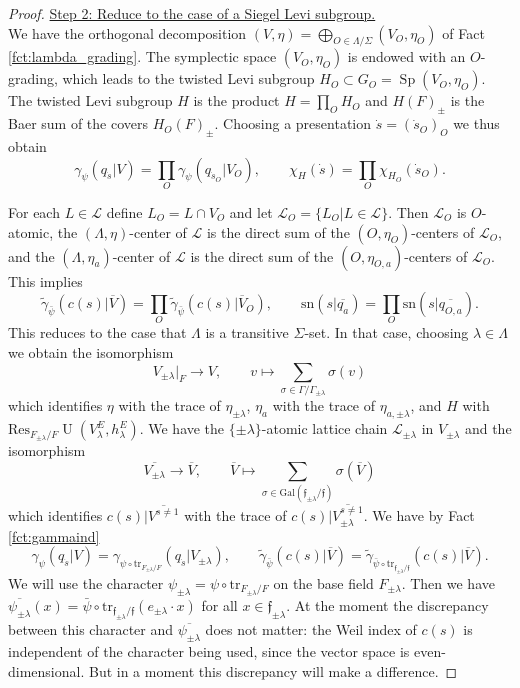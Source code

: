 \documentclass{article}
\def\mc#1{\mathcal{#1}}
\def\tx#1{\textrm{#1}}
\def\ol#1{\overline{#1}}
\def\ul#1{\underline{#1}}
\DeclareMathOperator{\Sp}{Sp}
\theoremstyle{definition}
\numberwithin{equation}{subsection}
\renewcommand{\-}{\hyp{}}
\DeclareMathOperator{\U}{U}
\newcommand{\rf}{\mathfrak{f}}
\begin{document}
\begin{proof}
	\ul{Step 2: Reduce to the case of a Siegel Levi subgroup.}\\
	We have the orthogonal decomposition $(V,\eta)=\bigoplus_{O \in \Lambda/\Sigma} (V_O,\eta_O)$ of Fact \ref{fct:lambda_grading}. The symplectic space $(V_O,\eta_O)$ is endowed with an $O$-grading, which leads to the twisted Levi subgroup $H_O \subset G_O=\Sp(V_O,\eta_O)$. The twisted Levi subgroup $H$ is the product $H=\prod_O H_O$ and $H(F)_\pm$ is the Baer sum of the covers $H_O(F)_\pm$. Choosing a presentation $\dot s = (\dot s_O)_O$ we thus obtain
	\[ \gamma_\psi(q_{\dot s}|V) = \prod_O \gamma_\psi(q_{\dot s_O}|V_O),\qquad \chi_H(\dot s) = \prod_O \chi_{H_O}(\dot s_O). \]
	
	For each $L \in \mc{L}$ define $L_O = L \cap V_O$ and let $\mc{L}_O=\{L_O|L \in \mc{L}\}$. Then $\mc{L}_O$ is $O$-atomic, the $(\Lambda,\eta)$-center of $\mc{L}$ is the direct sum of the $(O,\eta_O)$-centers of $\mc{L}_O$, and the $(\Lambda,\eta_a)$-center of $\mc{L}$ is the direct sum of the $(O,\eta_{O,a})$-centers of $\mc{L}_O$. This implies 
	\[ \tilde\gamma_{\bar\psi}(c(s)|\ol{V}) = \prod_O \tilde\gamma_{\bar\psi}(c(s)|\ol{V}_O),\qquad \tx{sn}(s|\ol{q_a}) = \prod_O \tx{sn}(s|\ol{q_{O,a}}). \]
	This reduces to the case that $\Lambda$ is a transitive $\Sigma$-set. In that case, choosing $\lambda \in \Lambda$ we obtain the isomorphism
	\[ V_{\pm\lambda}|_F \to V,\qquad v \mapsto \sum_{\sigma \in \Gamma/\Gamma_{\pm\lambda}}\sigma(v) \]
	which identifies $\eta$ with the trace of $\eta_{\pm\lambda}$, $\eta_a$ with the trace of $\eta_{a,\pm\lambda}$, and $H$ with $\tx{Res}_{F_{\pm\lambda}/F}\U(V_{\lambda}^E,h_\lambda^E)$. We have the $\{\pm\lambda\}$-atomic lattice chain $\mc{L}_{\pm\lambda}$ in $V_{\pm\lambda}$ and the isomorphism
	\[ \ol{V_{\pm\lambda}} \to \ol{V},\qquad \ol{V} \mapsto \sum_{\sigma \in \tx{Gal}(\rf_{\pm\lambda}/\rf)} \sigma(\ol{V}) \]
	which identifies $c(s)|\ol{V^{s\neq 1}}$ with the trace of $c(s)|\ol{V_{\pm\lambda}^{s \neq 1}}$. We have by Fact \ref{fct:gammaind}
	\[ \gamma_\psi(q_{\dot s}|V) = \gamma_{\psi\circ\tx{tr}_{F_{\pm\lambda}/F}}(q_{\dot s}|V_{\pm\lambda}),\qquad \tilde\gamma_{\bar\psi}(c(s)|\ol{V}) = \tilde\gamma_{\bar\psi\circ\tx{tr}_{\rf_{\pm\lambda}/\rf}}(c(s)|\ol{V}). \]
	We will use the character $\psi_{\pm\lambda}=\psi\circ\tx{tr}_{F_{\pm\lambda}/F}$ on the base field $F_{\pm\lambda}$. Then we have $\ol{\psi_{\pm\lambda}}(x) = \bar\psi\circ\tx{tr}_{\rf_{\pm\lambda}/\rf}(e_{\pm\lambda}\cdot x)$ for all $x \in \rf_{\pm\lambda}$. At the moment the discrepancy between this character and $\ol{\psi_{\pm\lambda}}$ does not matter: the Weil index of $c(s)$ is independent of the character being used, since the vector space is even-dimensional. But in a moment this discrepancy will make a difference.


\end{proof}
\end{document}
